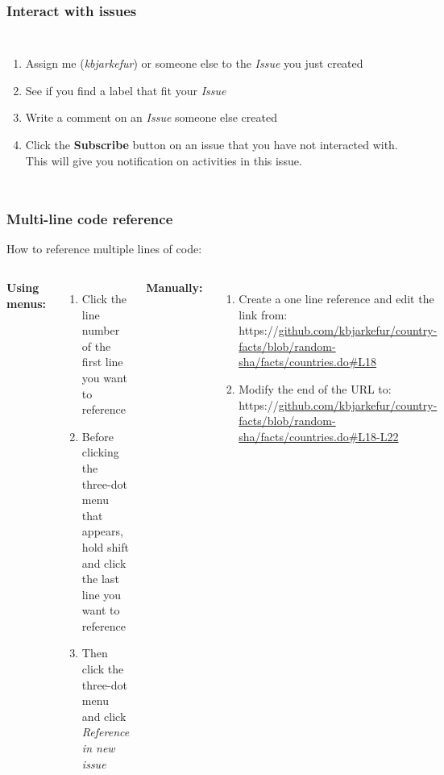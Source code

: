 \documentclass[aspectratio=169]{beamer} %
\newcommand{\trainingURL}[1]{{\color{blue}\url{#1}}}
\newcommand{\traininerUsername}{kbjarkefur}
\newcommand{\repoName}{\traininerUsername/country-facts}
\newcommand{\trainingRepoURL}[1]{\trainingURL{github.com/\repoName #1}}
\begin{document}
\begin{frame}
	\frametitle{Interact with issues}
	
	\begin{columns}[c] 
		
		
		\begin{enumerate}
			\item Assign me (\textit{\traininerUsername}) or someone else to the \textit{Issue} you just created
			\item See if you find a label that fit your \textit{Issue}
			\item Write a comment on an \textit{Issue} someone else created
			\item Click the \textbf{Subscribe} button on an issue that you have not interacted with. This will give you notification on activities in this issue. 
		\end{enumerate}	
		

	\end{columns}
\end{frame}

\begin{frame}
	\frametitle{Multi-line code reference}
	
	How to reference multiple lines of code:
	\vspace{.5cm}
	
	\begin{columns}[T] 
		
		\textbf{Using menus:}
		\begin{enumerate}
			\item Click the line number of the first line you want to reference
			\item Before clicking the three-dot menu that appears, hold shift and click the last line you want to reference
			\item Then click the three-dot menu and click \textit{Reference in new issue}
		\end{enumerate}	
		
		\textbf{Manually:}
		\begin{enumerate}
			\item Create a one line reference and edit the link from: {\color{blue}https://}\trainingRepoURL{/blob/random-sha/facts/countries.do\#L18}
			\item Modify the end of the URL to: {\color{blue}https://}\trainingRepoURL{/blob/random-sha/facts/countries.do\#L18-L22}
		\end{enumerate}	
	\end{columns}
\end{frame}
\end{document}
